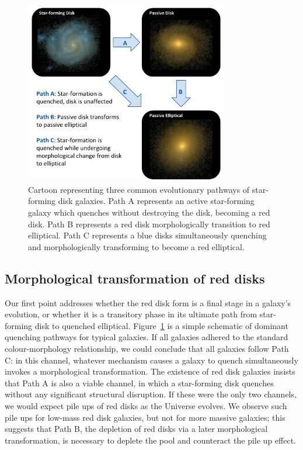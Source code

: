 \documentclass[useAMS,usenatbib]{mn2e}
\begin{document}
\begin{figure}
\centering
\includegraphics[width=3.5in]{figures/cartoon.pdf}
\caption{Cartoon representing three common evolutionary pathways of star-forming disk galaxies. Path A represents an active star-forming galaxy which quenches without destroying the disk, becoming a red disk. Path B represents a red disk morphologically transition to red elliptical. Path C represents a blue disks simultaneously quenching and morphologically transforming to become a red elliptical. }
\label{fig:cartoon}
\end{figure}

\subsection{Morphological transformation of red disks}

Our first point addresses whether the red disk form is a final stage in a galaxy's evolution, or whether it is a transitory phase in its ultimate path from star-forming disk to quenched elliptical. Figure~\ref{fig:cartoon} is a simple schematic of dominant quenching pathways for typical galaxies. If all galaxies adhered to the standard colour-morphology relationship, we could conclude that all galaxies follow Path C: in this channel, whatever mechanism causes a galaxy to quench simultaneously invokes a morphological transformation. The existence of red disk galaxies insists that Path A is also a viable channel, in which a star-forming disk quenches without any significant structural disruption. If these were the only two channels, we would expect pile ups of red disks as the Universe evolves. We observe such pile ups for low-mass red disk galaxies, but not for more massive galaxies; this suggests that Path B, the depletion of red disks via a later morphological transformation, is necessary to deplete the pool and counteract the pile up effect.
\end{document}
